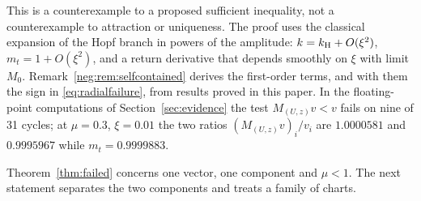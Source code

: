 This is a counterexample to a proposed sufficient inequality, not a counterexample to attraction or uniqueness. The proof uses the classical expansion of the Hopf branch in powers of the amplitude: $k=k_{\mathrm H}+O(\xi^2)$, $m_t=1+O(\xi^2)$, and a return derivative that depends smoothly on $\xi$ with limit $M_0$. Remark~\ref{neg:rem:selfcontained} derives the first-order terms, and with them the sign in \eqref{eq:radialfailure}, from results proved in this paper. In the floating-point computations of Section~\ref{sec:evidence} the test $M_{(U,z)}v<v$ fails on nine of 31 cycles; at $\mu=0.3$, $\xi=0.01$ the two ratios $(M_{(U,z)}v)_i/v_i$ are $1.0000581$ and $0.9995967$ while $m_t=0.9999883$.

Theorem~\ref{thm:failed} concerns one vector, one component and $\mu<1$. The next statement separates the two components and treats a family of charts.

